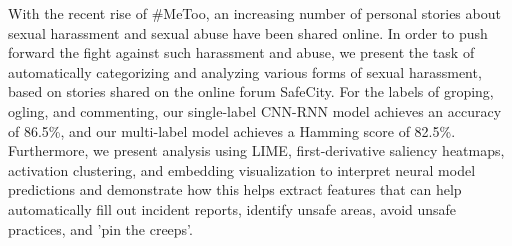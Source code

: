 With the recent rise of \#MeToo, an increasing number of personal stories about sexual harassment and sexual abuse have been shared online. In order to push forward the fight against such harassment and abuse, we present the task of automatically categorizing and analyzing various forms of sexual harassment, based on stories shared on the online forum SafeCity. For the labels of groping, ogling, and commenting, our single-label CNN-RNN model achieves an accuracy of 86.5\%, and our multi-label model achieves a Hamming score of 82.5\%. Furthermore, we present analysis using LIME, first-derivative saliency heatmaps, activation clustering, and embedding visualization to interpret neural model predictions and demonstrate how this helps extract features that can help automatically fill out incident reports, identify unsafe areas, avoid unsafe practices, and 'pin the creeps'.
